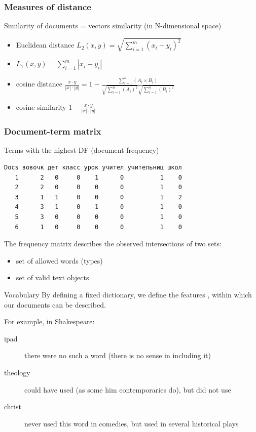 \documentclass[svgnames]{beamer}
\begin{document}
\begin{frame}
  \frametitle{Measures of distance}
  Similarity of documents = vectors similarity (in N-dimensional space)
  \begin{itemize}
  \item Euclidean distance $L_2(x,y) = \sqrt{\sum_{i=1}^{m}(x_i-y_i)^2}$
  \item $L_1(x,y) = \sum_{i=1}^{m}|x_i-y_i| $
  \item cosine distance $\frac{x\cdot y}{|x|\cdot|y|} = 1 -
    \frac{\sum_{i=1}^{n}(A_i\times B_i)}{\sqrt{\sum_{i=1}^{n}(A_i)^2}\sqrt{\sum_{i=1}^{n}(B_i)^2}}$
  \item cosine similarity  $1-\frac{x\cdot y}{|x|\cdot|y|}$
  \end{itemize}
\end{frame}



\begin{frame}[fragile]
  \frametitle{Document-term matrix}
  Terms with the highest DF (document frequency)
  \footnotesize
\begin{verbatim}
Docs вовочк дет класс урок учител учительниц школ
   1      2   0     0    1      0          1    0
   2      2   0     0    0      0          1    0
   3      1   1     0    0      0          1    2
   4      3   1     0    1      0          1    0
   5      3   0     0    0      0          1    0
   6      1   0     0    0      0          1    0
\end{verbatim}
\end{frame}



\begin{frame}
  The frequency matrix describes the observed intersections of two
   sets:
   \begin{itemize}
   \item set of allowed words (types)
   \item set of valid text objects
   \end{itemize}
\end{frame}


\begin{frame}{Vocabulary}
  By defining a fixed dictionary, we define the features , within which our
  documents can be described.

  For example, in Shakespeare:

  \begin{description}
  \item[ipad] there were no such a word (there is no sense in including it)
  \item[theology] could have used (as some him contemporaries do), but
    did not use
  \item[christ] never used this word in comedies, but
    used in several historical plays
  \end{description}
\end{frame}
\end{document}
